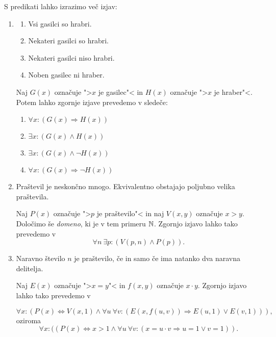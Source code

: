 \documentclass[12pt, a4paper]{article}
\renewcommand{\implies}{\Rightarrow}
\renewcommand{\iff}{\Leftrightarrow}
\begin{document}
\begin{zgled}
S predikati lahko izrazimo več izjav:

\begin{enumerate}
\item
\begin{multicols}{2}
\begin{enumerate}
\item Vsi gasilci so hrabri.
\item Nekateri gasilci so hrabri.
\item Nekateri gasilci niso hrabri.
\item Noben gasilec ni hraber.
\end{enumerate}
\end{multicols}

Naj $G(x)$ označuje ">$x$ je gasilec"< in $H(x)$ označuje ">$x$ je hraber"<. Potem lahko zgornje izjave prevedemo v sledeče:

\begin{multicols}{2}
\begin{enumerate}
\item $\forall x\colon(G(x)\implies H(x))$
\item $\exists x\colon(G(x)\land H(x))$
\item $\exists x\colon(G(x)\land\neg H(x))$
\item $\forall x\colon(G(x)\implies\neg H(x))$
\end{enumerate}
\end{multicols}

\item Praštevil je neskončno mnogo. Ekvivalentno obstajajo poljubno velika praštevila.

Naj $P(x)$ označuje ">$p$ je praštevilo"< in naj $V(x,y)$ označuje $x>y$. Določimo še \emph{domeno}, ki je v tem primeru $\mathbb{N}$. Zgornjo izjavo lahko tako prevedemo v
\[
\forall n~\exists p\colon(V(p,n) \land P(p)).
\]
\item Naravno število $n$ je praštevilo, če in samo če ima natanko dva naravna delitelja.

Naj $E(x)$ označuje ">$x=y$"< in $f(x,y)$ označuje $x\cdot y$. Zgornjo izjavo lahko tako prevedemo v

\[
\forall x\colon(P(x)\iff V(x,1)\land \forall u~\forall v\colon (E(x,f(u,v))\implies E(u,1)\lor E(v,1))),
\]
oziroma
\[
\forall x\colon((P(x)\iff x>1\land \forall u~\forall v\colon(x=u\cdot v\implies u=1\lor v=1)).
\]
\end{enumerate}
\end{zgled}
\end{document}
